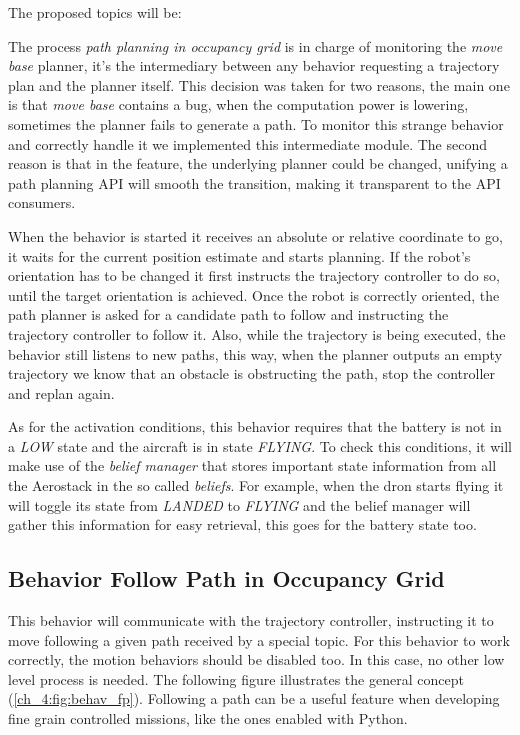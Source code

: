   The proposed topics will be:

  


  The process \textit{path planning in occupancy grid} is in charge of monitoring the \textit{move base} planner, it's the intermediary between any behavior requesting a trajectory plan and the planner itself. This decision was taken for two reasons, the main one is that \textit{move base} contains a bug, when the computation power is lowering, sometimes the planner fails to generate a path. To monitor this strange behavior and correctly handle it we implemented this intermediate module. The second reason is that in the feature, the underlying planner could be changed, unifying a path planning API will smooth the transition, making it transparent to the API consumers.

  When the behavior is started it receives an absolute or relative coordinate to go, it waits for the current position estimate and starts planning. If the robot's orientation has to be changed it first instructs the trajectory controller to do so, until the target orientation is achieved. Once the robot is correctly oriented, the path planner is asked for a candidate path to follow and instructing the trajectory controller to follow it. Also, while the trajectory is being executed, the behavior still listens to new paths, this way, when the planner outputs an empty trajectory we know that an obstacle is obstructing the path, stop the controller and replan again. 

  As for the activation conditions, this behavior requires that the battery is not in a \textit{LOW} state and the aircraft is in state \textit{FLYING}. To check this conditions, it will make use of the \textit{belief manager} that stores important state information from all the Aerostack in the so called \textit{beliefs}. For example, when the dron starts flying it will toggle its state from \textit{LANDED} to \textit{FLYING} and the belief manager will gather this information for easy retrieval, this goes for the battery state too.

\subsection{Behavior Follow Path in Occupancy Grid} \label{ch_4:subsect:behav_fpog}

  This behavior will communicate with the trajectory controller, instructing it to move following a given path received by a special topic. For this behavior to work correctly, the motion behaviors should be disabled too. In this case, no other low level process is needed. The following figure illustrates the general concept (\ref{ch_4:fig:behav_fp}). Following a path can be a useful feature when developing fine grain controlled missions, like the ones enabled with Python.

